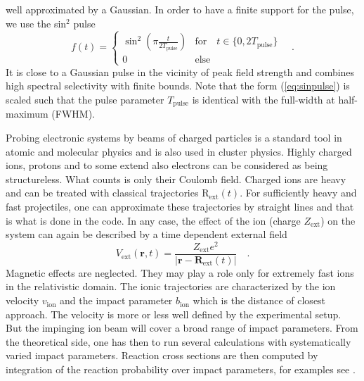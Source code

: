 \documentclass[final,1p]{elsarticle}
\begin{document}
well approximated by a Gaussian.  In order to have a finite support
for the pulse, we use the sin$^2$ pulse
\begin{equation}
  f(t)
  =
  \left\{\begin{array}{ll}
    \sin^2{\left(\pi\frac{t}{2T_\mathrm{pulse}}\right)}
        &\mbox{for}\quad t\in\{0,2T_\mathrm{pulse}\}  \\
    0  &\mbox{else}
  \end{array}\right.
  \quad.
\label{eq:sinpulse}
\end{equation}
It is close to a Gaussian pulse in the vicinity of peak field strength
and combines high spectral selectivity with finite bounds. Note that
the form (\ref{eq:sinpulse}) is scaled such that the pulse parameter
$T_\mathrm{pulse}$ is identical with the {full-width at
half-maximum} ({FWHM}).



Probing electronic systems by beams of charged particles is a standard
tool in atomic and molecular physics \cite{Bra92} and is also used in
cluster physics. Highly charged ions, protons and to some extend also
electrons can be considered as being structureless. What counts is
only their Coulomb field.  Charged ions are heavy and can be treated
with classical trajectories
%
$\mathrm{R}_\mathrm{ext}(t)$.
%
For sufficiently heavy and fast projectiles, one can approximate
these trajectories by straight lines and that is what is done in the
code.  In any case, the effect of the ion (charge $Z_\mathrm{ext}$) on
the system can again be described by a time dependent external field
\begin{equation}
  V_\mathrm{ext}(\mathbf{r},t)
  =
  \frac{Z_\mathrm{ext}e^2}{|\mathbf{r}-\mathbf{R}_\mathrm{ext}(t)|}
  \quad.
\label{eq:ionext}
\end{equation}
Magnetic effects are neglected. They may play a role only for extremely
fast ions in the relativistic domain.
%
The ionic trajectories are characterized by the ion velocity
$v_\mathrm{ion}$ and the impact parameter $b_\mathrm{ion}$ which is
the distance of closest approach. The velocity is more or less well
defined by the experimental setup. But the impinging ion beam will
cover a broad range of impact parameters. From the theoretical side,
one has then to run several calculations with systematically varied
impact parameters.  Reaction cross sections are then computed by
integration of the reaction probability over impact parameters, for
examples see \cite{Rei98a}.
\end{document}
